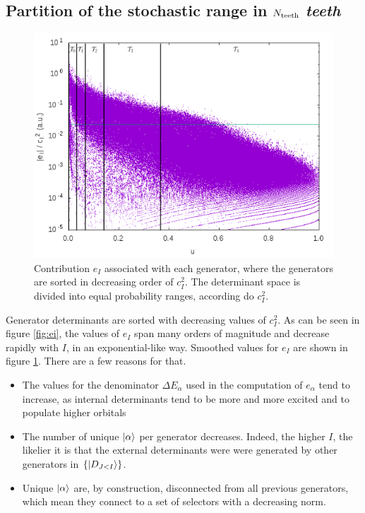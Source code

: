 \documentclass[./thesis.tex]{subfiles}
\begin{document}
\subsection{Partition of the stochastic range in $N_\text{teeth}$ \emph{teeth}}
\label{sec:partition}

\begin{figure}[h!]
	\begin{center}
		\includegraphics[width=0.9\columnwidth]{figures/pt2/eici2_comb}
	\end{center}
	\caption{Contribution $e_I$ associated with each generator, where the generators are sorted in decreasing order of $c_I^2$. The determinant space is divided into equal probability ranges, according do $c_I^2$.}
	\label{fig:p_i}
\end{figure}

Generator determinants are sorted with decreasing values of $c_I^2$.
As can be seen in figure \ref{fig:ei}, the values of $e_I$ span many orders of magnitude and decrease rapidly with $I$, in an exponential-like way. Smoothed values for $e_I$ are shown in figure \ref{fig:p_i}. There are a few reasons for that.
\begin{itemize}
	\item
	The values for the denominator $\Delta E_\alpha$ used in the computation of $e_\alpha$ tend to increase, as internal determinants tend to be more and more excited and to populate higher orbitals 
	\item
	The number of unique $\ket \alpha$ per generator decreases. Indeed, the higher $I$, the likelier it is that the external determinants were were generated by other generators in $\{\ket{D_{J<I}}\}$.
	\item
	Unique $\ket \alpha$ are, by construction, disconnected from all previous generators, which mean they connect to a set of selectors with a decreasing norm.
\end{itemize}
\end{document}
